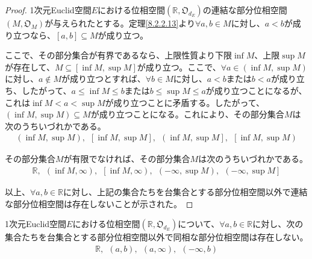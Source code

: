 \documentclass[dvipdfmx]{jsarticle}
\begin{document}
\begin{proof}
1次元Euclid空間$E$における位相空間$\left( \mathbb{R},\mathfrak{O}_{d_{E}} \right)$の連結な部分位相空間$\left( M,\mathfrak{O}_{M} \right)$が与えられたとする。定理\ref{8.2.2.13}より$\forall a,b \in M$に対し、$a < b$が成り立つなら、$[ a,b] \subseteq M$が成り立つ。\par
ここで、その部分集合が有界であるなら、上限性質より下限$\inf M$、上限$\sup M$が存在して、$M \subseteq \left[ \inf M,\sup M \right]$が成り立つ。ここで、$\forall a \in \left( \inf M,\sup M \right)$に対し、$a \notin M$が成り立つとすれば、$\forall b \in M$に対し、$a < b$または$b < a$が成り立ち、したがって、$a \leq \inf M \leq b$または$b \leq \sup M \leq a$が成り立つことになるが、これは$\inf M < a < \sup M$が成り立つことに矛盾する。したがって、$\left( \inf M,\sup M \right) \subseteq M$が成り立つことになる。これにより、その部分集合$M$は次のうちいづれかである。
\begin{align*}
\left( \inf M,\sup M \right),\ \ \left[ \inf M,\sup M \right],\ \ \left( \inf M,\sup M \right],\ \ \left[ \inf M,\sup M \right)
\end{align*}\par
その部分集合$M$が有限でなければ、その部分集合$M$は次のうちいづれかである。
\begin{align*}
\mathbb{R},\ \ \left( \inf M,\infty \right),\ \ \left[ \inf M,\infty \right),\ \ \left( - \infty,\sup M \right),\ \ \left( - \infty,\sup M \right]
\end{align*}\par
以上、$\forall a,b \in \mathbb{R}$に対し、上記の集合たちを台集合とする部分位相空間以外で連結な部分位相空間は存在しないことが示された。
\end{proof}
\begin{thm}\label{8.2.2.15}
1次元Euclid空間$E$における位相空間$\left( \mathbb{R},\mathfrak{O}_{d_{E}} \right)$について、$\forall a,b \in \mathbb{R}$に対し、次の集合たちを台集合とする部分位相空間以外で同相な部分位相空間は存在しない。
\begin{align*}
\mathbb{R},\ \ (a,b),\ \ (a,\infty),\ \ ( - \infty,b)
\end{align*}
\end{thm}
\end{document}
